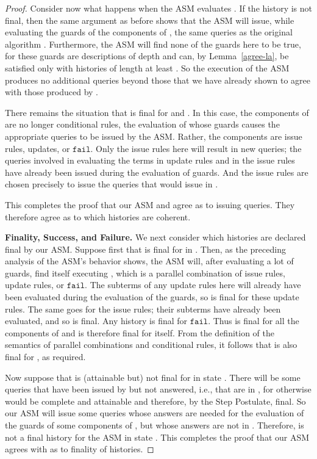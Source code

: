 \documentclass{LMCS}
\theoremstyle{definition}
\newcommand{\ttt}[1]{\ensuremath{\mathtt {#1}}}
\begin{document}
\begin{proof}
Consider now what happens when the ASM evaluates
.  If the history 
is not final, then the same argument as before shows that the ASM will
issue, while evaluating the guards of the components of
, the same queries as the original algorithm .
Furthermore, the ASM will find none of the guards here to be true, for
these guards are descriptions of depth  and can, by
Lemma~\ref{agree-la}, be satisfied only with histories of length at
least .  So the execution of the ASM produces no additional
queries beyond those that we have already shown to agree with those
produced by .

There remains the situation that  is final for  and .  In
this case, the components of  are no longer
conditional rules, the evaluation of whose guards causes the
appropriate queries to be issued by the ASM.  Rather, the components
are issue rules, updates, or \ttt{fail}.  Only the issue rules here
will result in new queries; the queries involved in evaluating the
terms in update rules and in the issue rules have already been issued
during the evaluation of guards.  And the issue rules are chosen
precisely to issue the queries that  would issue in .

This completes the proof that our ASM and  agree as to issuing
queries.  They therefore agree as to which histories are coherent.

\medskip\noindent\textbf{Finality, Success, and Failure.}
We next consider which histories are declared final by our ASM.
Suppose first that  is final for  in .  Then, as the
preceding analysis of the ASM's behavior shows, the ASM will,
after evaluating a lot of guards, find itself executing
, which is a parallel combination of issue
rules, update rules, or \ttt{fail}.  The subterms of any update
rules here will already have been evaluated during the evaluation
of the guards, so  is final for these update rules.  The same
goes for the issue rules; their subterms have already been
evaluated, and so  is final.  Any history is final for
\ttt{fail}.  Thus  is final for all the components of
 and is therefore final for 
itself.  From the definition of the semantics of parallel combinations
and conditional rules, it follows that  is also final for ,
as required.

Now suppose that  is (attainable but) not final for  in
state .  There will be some queries that have been issued by
 but not answered, i.e., that are in
, for otherwise
 would be complete and attainable and therefore, by the Step
Postulate, final.  So our ASM will issue some queries whose
answers are needed for the evaluation of the guards of some
components of , but whose answers are not in
.  Therefore,  is not a final history for the ASM in
state .  This completes the proof that our ASM agrees with 
as to finality of histories.



\end{proof}
\end{document}
